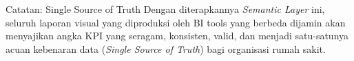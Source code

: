 \begin{mybox}{Catatan: Single Source of Truth}
Dengan diterapkannya \textit{Semantic Layer} ini, seluruh laporan visual yang diproduksi oleh BI tools yang berbeda dijamin akan menyajikan angka KPI yang seragam, konsisten, valid, dan menjadi satu-satunya acuan kebenaran data (\textit{Single Source of Truth}) bagi organisasi rumah sakit.
\end{mybox}